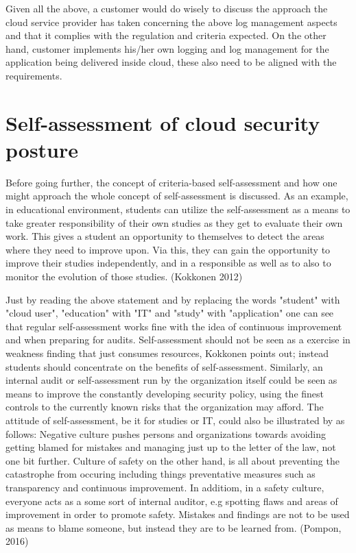 \documentclass{article}
\begin{document}
\par
Given all the above, a customer would do wisely to discuss the approach the cloud service provider has taken concerning the above log management aspects and that it complies with the regulation and criteria expected. On the other hand, customer implements his/her own logging and log management for the application being delivered inside cloud, these also need to be aligned with the requirements.
\section{Self-assessment of cloud security posture}
Before going further, the concept of criteria-based self-assessment and how one might approach the whole concept of self-assessment is discussed. 
As an example, in educational environment, students can utilize the self-assessment as a means to take greater responsibility of their own studies as they get to evaluate their own work. This gives a student an opportunity to themselves to detect the areas where they need to improve upon.
Via this, they can gain the opportunity to improve their studies independently, and in a responsible as well as to also to monitor the evolution of those studies. (Kokkonen 2012)
\par
Just by reading the above statement and by replacing the words "student" with "cloud user", "education" with "IT" and "study" with "application" one can see that regular self-assessment works fine with the idea of continuous improvement and when preparing for audits.
Self-assessment should not be seen as a exercise in weakness finding that just consumes resources, Kokkonen points out; instead students should concentrate on the benefits of self-assessment.
Similarly, an internal audit or self-assessment run by the organization itself could be seen as means to improve the constantly developing security policy, using the finest controls to the currently known risks that the organization may afford.
The attitude of self-assessment, be it for studies or IT, could also be illustrated by as follows: Negative culture pushes persons and organizations towards avoiding getting blamed for mistakes and managing just up to the letter of the law, not one bit further.
Culture of safety on the other hand, is all about preventing the catastrophe from occuring including things preventative measures such as transparency and continuous improvement. In additiom, in a safety culture, everyone acts as a some sort of internal auditor, e.g spotting flaws and areas of improvement in order to promote safety. Mistakes and findings are not to be used as means to blame someone, but instead they are to be learned from. (Pompon, 2016)
\end{document}
